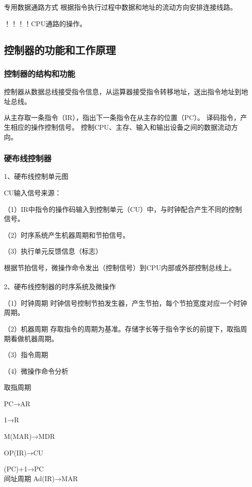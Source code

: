 \documentclass{ctexart}
\begin{document}
专用数据通路方式
根据指令执行过程中数据和地址的流动方向安排连接线路。

！！！！CPU通路的操作。



\subsection{控制器的功能和工作原理}

\subsubsection{控制器的结构和功能}
控制器从数据总线接受指令信息，从运算器接受指令转移地址，送出指令地址到地址总线。

从主存取一条指令（IR），指出下一条指令在从主存的位置（PC）。
译码指令，产生相应的操作控制信号。
控制CPU、主存、输入和输出设备之间的数据流动方向。


\subsubsection{硬布线控制器}

1、硬布线控制单元图

CU输入信号来源：

（1）IR中指令的操作码输入到控制单元（CU）中，与时钟配合产生不同的控制信号。

（2）时序系统产生机器周期和节拍信号。

（3）执行单元反馈信息（标志）

根据节拍信号，微操作命令发出（控制信号）到CPU内部或外部控制总线上。
\\\\

2、硬布线控制器的时序系统及微操作

（1）时钟周期
时钟信号控制节拍发生器，产生节拍，每个节拍宽度对应一个时钟周期。

（2）机器周期
存取指令的周期为基准。存储字长等于指令字长的前提下，取指周期看做机器周期。

（3）指令周期
 
（4）微操作命令分析

取指周期

PC→AR

1→R

M(MAR)→MDR

OP(IR)→CU

(PC)+1→PC
\\

间址周期
Ad(IR)→MAR
\end{document}
